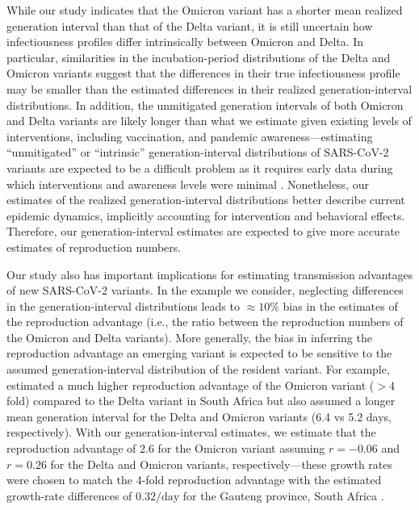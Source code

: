 \documentclass[12pt]{article}
\begin{document}
While our study indicates that the Omicron variant has a shorter mean realized generation interval than that of the Delta variant, it is still uncertain how infectiousness profiles differ intrinsically between Omicron and Delta.
In particular, similarities in the incubation-period distributions of the Delta and Omicron variants suggest that the differences in their true infectiousness profile may be smaller than the estimated differences in their realized generation-interval distributions.
In addition, the unmitigated generation intervals of both Omicron and Delta variants are likely longer than what we estimate given existing levels of interventions, including vaccination, and pandemic awareness---estimating ``unmitigated'' or ``intrinsic'' generation-interval distributions of SARS-CoV-2 variants are expected to be a difficult problem as it requires early data during which interventions and awareness levels were minimal \citep{sender2021unmitigated}.
Nonetheless, our estimates of the realized generation-interval distributions better describe current epidemic dynamics, implicitly accounting for intervention and behavioral effects.
Therefore, our generation-interval estimates are expected to give more accurate estimates of reproduction numbers.

Our study also has important implications for estimating transmission advantages of new SARS-CoV-2 variants.
In the example we consider, neglecting differences in the generation-interval distributions leads to $\approx 10\%$ bias in the estimates of the reproduction advantage (i.e., the ratio between the reproduction numbers of the Omicron and Delta variants).
More generally, the bias in inferring the reproduction advantage an emerging variant is expected to be sensitive to the assumed generation-interval distribution of the resident variant.
For example, \cite{pearson2021bounding} estimated a much higher reproduction advantage of the Omicron variant ($> 4$ fold) compared to the Delta variant in South Africa but also assumed a longer mean generation interval for the Delta and Omicron variants (6.4 vs 5.2 days, respectively).
With our generation-interval estimates, we estimate that the reproduction advantage of 2.6 for the Omicron variant assuming $r=-0.06$ and $r=0.26$ for the Delta and Omicron variants, respectively---these growth rates were chosen to match the 4-fold reproduction advantage with the estimated growth-rate differences of $0.32/\mathrm{day}$ for the Gauteng province, South Africa \cite{pearson2021bounding}.
\end{document}

